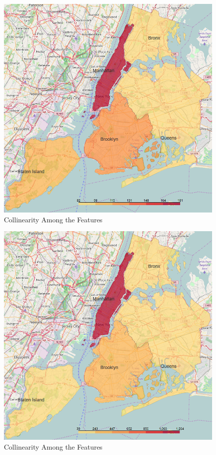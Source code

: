 \documentclass[sigconf]{acmart}
\begin{document}
\begin{figure}[!htpb]
	\centering
	\includegraphics[width=0.7\linewidth]{images/price_per_district}
	\caption{Collinearity Among the Features}
	\label{fig:datadistribution:price}
\end{figure}

\begin{figure}[!htpb]
	\centering
	\includegraphics[width=0.7\linewidth]{images/cultural_organizations_per_district}
	\caption{Collinearity Among the Features}
	\label{fig:datadistribution:cultural}
\end{figure}
\end{document}

